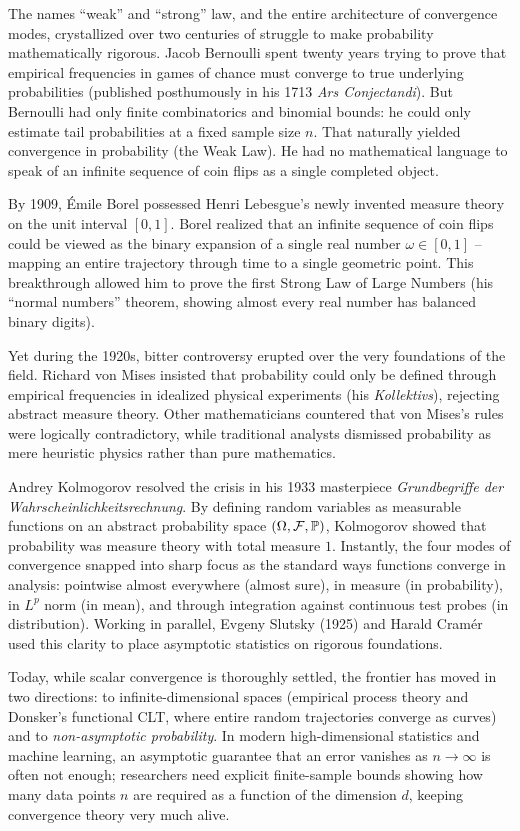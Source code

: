 \begin{historybox}
The names ``weak'' and ``strong'' law, and the entire architecture of convergence modes,
crystallized over two centuries of struggle to make probability mathematically rigorous.
Jacob Bernoulli spent twenty years trying to prove that empirical frequencies in games
of chance must converge to true underlying probabilities (published posthumously in his
1713 \emph{Ars Conjectandi}). But Bernoulli had only finite combinatorics and binomial
bounds: he could only estimate tail probabilities at a fixed sample size $n$. That
naturally yielded convergence in probability (the Weak Law). He had no mathematical
language to speak of an infinite sequence of coin flips as a single completed object.

By 1909, \'Emile Borel possessed Henri Lebesgue's newly invented measure theory on the
unit interval $[0,1]$. Borel realized that an infinite sequence of coin flips could be
viewed as the binary expansion of a single real number $\omega \in [0,1]$ -- mapping an
entire trajectory through time to a single geometric point. This breakthrough allowed
him to prove the first Strong Law of Large Numbers (his ``normal numbers'' theorem,
showing almost every real number has balanced binary digits).

Yet during the 1920s, bitter controversy erupted over the very foundations of the
field. Richard von Mises insisted that probability could only be defined through
empirical frequencies in idealized physical experiments (his \emph{Kollektivs}),
rejecting abstract measure theory. Other mathematicians countered that von Mises's
rules were logically contradictory, while traditional analysts dismissed probability
as mere heuristic physics rather than pure mathematics.

Andrey Kolmogorov resolved the crisis in his 1933 masterpiece \emph{Grundbegriffe der
Wahrscheinlichkeitsrechnung}. By defining random variables as measurable functions on an
abstract probability space $(\Omega, \mathcal{F}, \P)$, Kolmogorov showed that probability
was measure theory with total measure $1$. Instantly, the four modes of
convergence snapped into sharp focus as the standard ways functions converge in
analysis: pointwise almost everywhere (almost sure), in measure (in probability), in
$L^p$ norm (in mean), and through integration against continuous test probes (in
distribution). Working in parallel, Evgeny Slutsky (1925) and Harald Cram\'er used this
clarity to place asymptotic statistics on rigorous foundations.

Today, while scalar convergence is thoroughly settled, the frontier has moved in two
directions: to infinite-dimensional spaces (empirical process theory and Donsker's
functional CLT, where entire random trajectories converge as curves) and to
\emph{non-asymptotic probability}. In modern high-dimensional statistics and machine
learning, an asymptotic guarantee that an error vanishes as $n \to \infty$ is often not
enough; researchers need explicit finite-sample bounds showing how many data points $n$
are required as a function of the dimension $d$, keeping convergence theory very much
alive.
\end{historybox}

